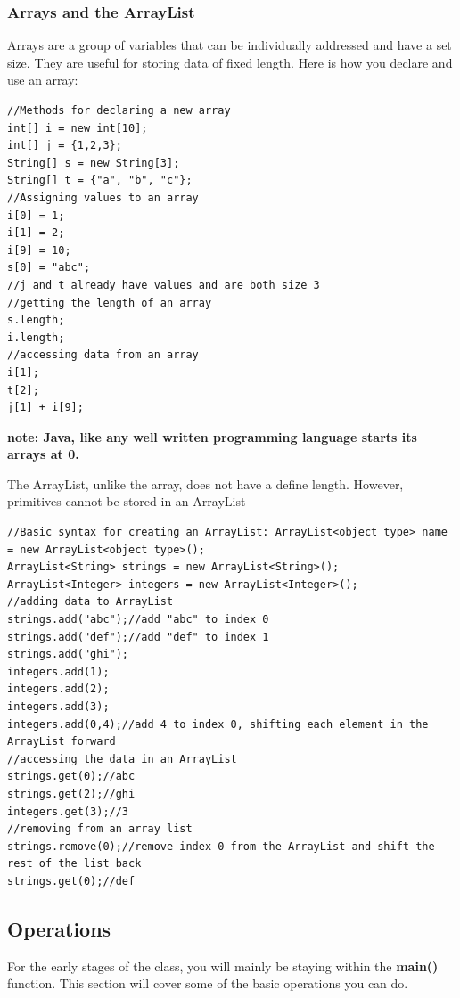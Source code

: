 \documentclass{article}
\begin{document}
\subsubsection{Arrays and the ArrayList}
Arrays are a group of variables that can be individually addressed and have a set size. They are useful for storing data of fixed length. Here is how you declare and use an array:
\begin{lstlisting}
//Methods for declaring a new array
int[] i = new int[10];
int[] j = {1,2,3};
String[] s = new String[3];
String[] t = {"a", "b", "c"};
//Assigning values to an array
i[0] = 1;
i[1] = 2;
i[9] = 10;
s[0] = "abc";
//j and t already have values and are both size 3
//getting the length of an array
s.length;
i.length;
//accessing data from an array
i[1];
t[2];
j[1] + i[9];
\end{lstlisting}
\textbf{note: Java, like any well written programming language starts its arrays at 0.}

The ArrayList, unlike the array, does not have a define length. However, primitives cannot be stored in an ArrayList
\begin{lstlisting}
//Basic syntax for creating an ArrayList: ArrayList<object type> name = new ArrayList<object type>();
ArrayList<String> strings = new ArrayList<String>();
ArrayList<Integer> integers = new ArrayList<Integer>();
//adding data to ArrayList
strings.add("abc");//add "abc" to index 0
strings.add("def");//add "def" to index 1
strings.add("ghi");
integers.add(1);
integers.add(2);
integers.add(3);
integers.add(0,4);//add 4 to index 0, shifting each element in the ArrayList forward
//accessing the data in an ArrayList 
strings.get(0);//abc
strings.get(2);//ghi
integers.get(3);//3
//removing from an array list
strings.remove(0);//remove index 0 from the ArrayList and shift the rest of the list back
strings.get(0);//def
\end{lstlisting}
\subsection{Operations}
For the early stages of the class, you will mainly be staying within the \textbf{main()} function. This section will cover some of the basic operations you can do.
\end{document}

